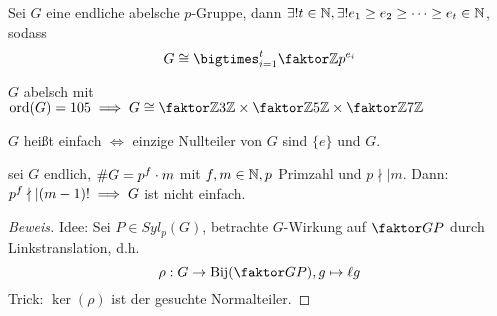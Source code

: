\documentclass[a4paper]{report}
\begin{document}
\begin{satz} %
Sei $G$ eine endliche abelsche $p$-Gruppe, dann $\exists ! t \in \mathbb{N}, \exists! e_{1} \ge e_{2} \ge \cdots \ge e_{t} \in \mathbb{N}$, sodass
\[G \cong \bigtimes_{i=1}^{t}\fak{\Z}{p^{e_{i}}}\]
\end{satz}

\begin{bsp*}
$G$ abelsch mit $\ord(G) = 105 \imp G \cong \fak \Z {3\Z} \times \fak \Z {5\Z} \times \fak \Z {7\Z}$
\end{bsp*}

\begin{whg*}
$G$ heißt einfach $\iff $ einzige Nullteiler von $G$ sind $\{e\}$ und $G$.
\end{whg*}


\begin{lemm}[Übung] %
  sei $G$ endlich, $\# G = p^{f}\cdot  m$ mit $f, m \in \mathbb{N}, p$ Primzahl und $p \nmid | m$. Dann:
  $p^{f} \nmid |(m-1)! \implies G$ ist nicht einfach.
\begin{proof}[Beweis]
  Idee: Sei $P \in Syl_{p}(G)$, betrachte $G$-Wirkung auf $\fak GP$ durch Linkstranslation, d.h.
  \[\rho: G \to \Bij(\fak GP), g \mapsto \ell g\]
  Trick: $\ker(\rho)$ ist der gesuchte Normalteiler.
\end{proof}
\end{lemm}
\end{document}
